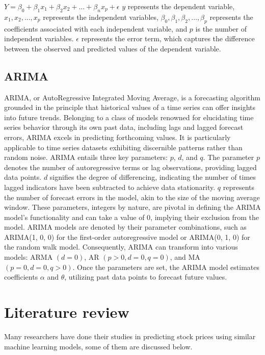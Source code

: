 \documentclass[conference,onecolumn,11pt]{IEEEtran}
\begin{document}
$Y = \beta_0+\beta_1 x_1 + \beta_2 x_2 + \ldots+\beta_n x_p + \epsilon$
$y$ represents the dependent variable, $x_1, x_2, ..., x_p$ represents the independent variables, $\beta_0,\beta_1,\beta_2,\ldots,\beta_p$ represents the coefficients associated with each independent variable, and $p$ is the number of independent variables. $\epsilon$ represents the error term, which captures the difference between the observed and predicted values of the dependent variable.


\subsection*{ARIMA}

ARIMA, or AutoRegressive Integrated Moving Average, is a forecasting algorithm grounded in the principle that historical values of a time series can offer insights into future trends.\cite{Khanderwal2021} Belonging to a class of models renowned for elucidating time series behavior through its own past data, including lags and lagged forecast errors, ARIMA excels in predicting forthcoming values. It is particularly applicable to time series datasets exhibiting discernible patterns rather than random noise. ARIMA entails three key parameters: $p$, $d$, and $q$. The parameter $p$ denotes the number of autoregressive terms or lag observations, providing lagged data points. $d$ signifies the degree of differencing, indicating the number of times lagged indicators have been subtracted to achieve data stationarity. $q$ represents the number of forecast errors in the model, akin to the size of the moving average window. These parameters, integers by nature, are pivotal in defining the ARIMA model's functionality and can take a value of 0, implying their exclusion from the model. ARIMA models are denoted by their parameter combinations, such as ARIMA(1, 0, 0) for the first-order autoregressive model or ARIMA(0, 1, 0) for the random walk model. Consequently, ARIMA can transform into various models: ARMA $(d=0)$, AR $(p>0, d=0, q=0)$, and MA $(p=0, d=0, q>0)$.  Once the parameters are set, the ARIMA model estimates coefficients $\alpha$ and $\theta$, utilizing past data points to forecast future values.

\section{Literature review}

Many researchers have done their studies in predicting stock prices using similar  machine learning models, some of them are discussed below. 
\end{document}

